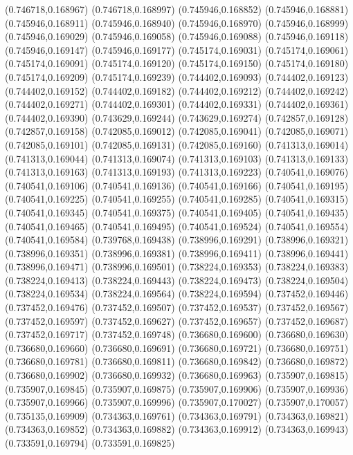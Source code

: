 (0.746718,0.168967)
(0.746718,0.168997)
(0.745946,0.168852)
(0.745946,0.168881)
(0.745946,0.168911)
(0.745946,0.168940)
(0.745946,0.168970)
(0.745946,0.168999)
(0.745946,0.169029)
(0.745946,0.169058)
(0.745946,0.169088)
(0.745946,0.169118)
(0.745946,0.169147)
(0.745946,0.169177)
(0.745174,0.169031)
(0.745174,0.169061)
(0.745174,0.169091)
(0.745174,0.169120)
(0.745174,0.169150)
(0.745174,0.169180)
(0.745174,0.169209)
(0.745174,0.169239)
(0.744402,0.169093)
(0.744402,0.169123)
(0.744402,0.169152)
(0.744402,0.169182)
(0.744402,0.169212)
(0.744402,0.169242)
(0.744402,0.169271)
(0.744402,0.169301)
(0.744402,0.169331)
(0.744402,0.169361)
(0.744402,0.169390)
(0.743629,0.169244)
(0.743629,0.169274)
(0.742857,0.169128)
(0.742857,0.169158)
(0.742085,0.169012)
(0.742085,0.169041)
(0.742085,0.169071)
(0.742085,0.169101)
(0.742085,0.169131)
(0.742085,0.169160)
(0.741313,0.169014)
(0.741313,0.169044)
(0.741313,0.169074)
(0.741313,0.169103)
(0.741313,0.169133)
(0.741313,0.169163)
(0.741313,0.169193)
(0.741313,0.169223)
(0.740541,0.169076)
(0.740541,0.169106)
(0.740541,0.169136)
(0.740541,0.169166)
(0.740541,0.169195)
(0.740541,0.169225)
(0.740541,0.169255)
(0.740541,0.169285)
(0.740541,0.169315)
(0.740541,0.169345)
(0.740541,0.169375)
(0.740541,0.169405)
(0.740541,0.169435)
(0.740541,0.169465)
(0.740541,0.169495)
(0.740541,0.169524)
(0.740541,0.169554)
(0.740541,0.169584)
(0.739768,0.169438)
(0.738996,0.169291)
(0.738996,0.169321)
(0.738996,0.169351)
(0.738996,0.169381)
(0.738996,0.169411)
(0.738996,0.169441)
(0.738996,0.169471)
(0.738996,0.169501)
(0.738224,0.169353)
(0.738224,0.169383)
(0.738224,0.169413)
(0.738224,0.169443)
(0.738224,0.169473)
(0.738224,0.169504)
(0.738224,0.169534)
(0.738224,0.169564)
(0.738224,0.169594)
(0.737452,0.169446)
(0.737452,0.169476)
(0.737452,0.169507)
(0.737452,0.169537)
(0.737452,0.169567)
(0.737452,0.169597)
(0.737452,0.169627)
(0.737452,0.169657)
(0.737452,0.169687)
(0.737452,0.169717)
(0.737452,0.169748)
(0.736680,0.169600)
(0.736680,0.169630)
(0.736680,0.169660)
(0.736680,0.169691)
(0.736680,0.169721)
(0.736680,0.169751)
(0.736680,0.169781)
(0.736680,0.169811)
(0.736680,0.169842)
(0.736680,0.169872)
(0.736680,0.169902)
(0.736680,0.169932)
(0.736680,0.169963)
(0.735907,0.169815)
(0.735907,0.169845)
(0.735907,0.169875)
(0.735907,0.169906)
(0.735907,0.169936)
(0.735907,0.169966)
(0.735907,0.169996)
(0.735907,0.170027)
(0.735907,0.170057)
(0.735135,0.169909)
(0.734363,0.169761)
(0.734363,0.169791)
(0.734363,0.169821)
(0.734363,0.169852)
(0.734363,0.169882)
(0.734363,0.169912)
(0.734363,0.169943)
(0.733591,0.169794)
(0.733591,0.169825)
